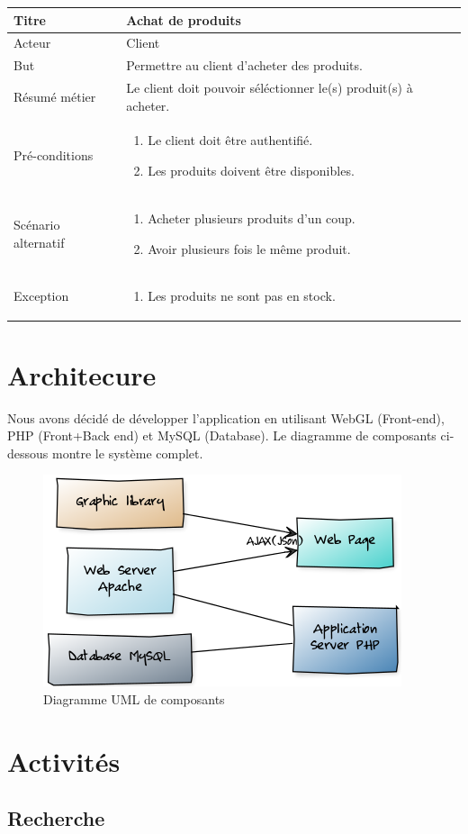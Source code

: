 \documentclass[12pt]{article}
\newcommand\addrow[2]{#1 &#2\\ }
\newcommand\addheading[2]{\textbf{#1} &#2\\ \hline}
\newcommand\tabularhead{\begin{tabular}{lp{11cm}}
\hline
}
\newcommand\addmulrow[2]{ \begin{minipage}[t][][t]{3.5cm}#1\end{minipage}%
    &\begin{minipage}[t][][t]{11cm}
    \begin{enumerate} #2   \end{enumerate}
    \end{minipage}\\ }
\newenvironment{usecase}{\tabularhead}
{\hline\end{tabular}}
\begin{document}
\begin{usecase}
    \addheading{Titre}{Achat de produits}
    \addrow{Acteur}{Client}
    \addrow{But}{Permettre au client d'acheter des produits.}
    \addrow{Résumé métier}{Le client doit pouvoir séléctionner le(s) produit(s) à acheter.}
    \addmulrow{Pré-conditions}{
    \item Le client doit être authentifié.
    \item Les produits doivent être disponibles.
    }
    \addmulrow{Scénario alternatif}{
    \item Acheter plusieurs produits d'un coup.
    \item Avoir plusieurs fois le même produit.
    }
    \addmulrow{Exception}{
    \item Les produits ne sont pas en stock.
    }
\end{usecase}

\newpage

\section{Architecure}
Nous avons décidé de développer l'application en utilisant WebGL (Front-end), PHP (Front+Back end) et MySQL (Database).
Le diagramme de composants ci-dessous montre le système complet.
\begin{figure}[ht]
    \center
    \includegraphics[scale=0.6]{../Diagrams/ComposantDiagrams/composants.png}
    \caption*{Diagramme UML de composants}
\end{figure}

\newpage
\section{Activités}

\subsection{Recherche}
\end{document}
